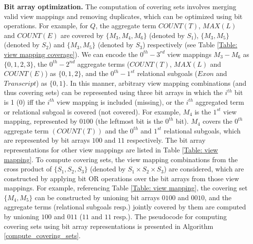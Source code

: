 \begin{example}
\textbf{Bit array optimization.} The computation of covering sets involves merging valid view mappings and removing duplicates, which can be optimized using bit operations. For example, for $Q$, the aggregate term $COUNT(T)$, $MAX(L)$ and $COUNT(E)$ are covered by $\{M_3, M_4, M_6\}$ (denoted by $S_1$), $\{M_3, M_5\}$ (denoted by $S_2$) and $\{M_3, M_5\}$ (denoted by $S_3$) respectively (see Table \ref{Table: view mapping coverage}). We can encode the $0^{th}-3^{rd}$ view mappings $M_3-M_6$ as $\{0,1,2,3\}$, the $0^{th}-2^{nd}$ aggregate terms ($COUNT(T)$, $MAX(L)$ and $COUNT(E)$) as $\{0, 1, 2\}$, and the $0^{th}-1^{st}$ relational subgoals ($Exon$ and $Transcript$) as $\{0, 1\}$.  In this manner, arbitrary view mapping combinations (and thus covering sets) can be represented using three bit arrays in which the $i^{th}$ bit is 1 (0) iff the $i^{th}$ view mapping is included (missing), or the $i^{th}$ aggregated term or relational subgoal is covered (not covered). 
For example, $M_4$ is the $1^{st}$ view mapping, represented by $0100$ (the leftmost bit is the $0^{th}$ bit). $M_4$ covers the $0^{th}$ aggregate term $(COUNT(T))$ and the $0^{th}$ and $1^{st}$ relational subgoals, which are represented by bit arrays $100$ and $11$ respectively. The bit array representations for other view mappings are listed in Table \ref{Table: view mapping}. To compute covering sets, the view mapping combinations from the cross product of $\{S_1, S_2, S_3\}$ (denoted by $S_1 \times S_2 \times S_3$) are considered, which are constructed by applying bit OR operations over the bit arrays from those view mappings. For example, referencing Table \ref{Table: view mapping}, the covering set $\{M_4, M_5\}$ can be constructed by unioning bit arrays $0100$ and $0010$, and the aggregate terms (relational subgoals resp.) jointly covered by them are computed by unioning $100$ and $011$ ($11$ and $11$ resp.). The pseudocode for computing covering sets using bit array representations is presented in Algorithm \ref{compute_covering_sets}.


\end{example}
